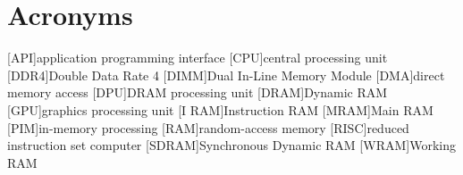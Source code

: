 \section{Acronyms}

\begin{acronym}[SDRAM]
	[API]{application programming interface}
	[CPU]{central processing unit}
	[DDR4]{Double Data Rate 4}
	[DIMM]{Dual In-Line Memory Module}
	[DMA]{direct memory access}
	[DPU]{\acs*{DRAM} processing unit}
	[DRAM]{Dynamic \acs*{RAM}}
	[GPU]{graphics processing unit}
	[I\kern1pt RAM]{Instruction \acs*{RAM}}
	[MRAM]{Main \acs*{RAM}}
	[PIM]{in-memory processing}
	[RAM]{random-access memory}
	[RISC]{reduced instruction set computer}
	[SDRAM]{Synchronous Dynamic \acs*{RAM}}
	[WRAM]{Working \acs*{RAM}}
\end{acronym}
